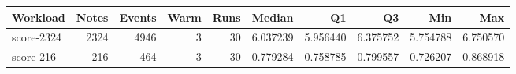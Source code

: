 \begin{tabular}{lrrrrrrrrr}
\hline
Workload & Notes & Events & Warm & Runs & Median & Q1 & Q3 & Min & Max \\
\hline
score-2324 & 2324 & 4946 & 3 & 30 & 6.037239 & 5.956440 & 6.375752 & 5.754788 & 6.750570 \\
score-216 & 216 & 464 & 3 & 30 & 0.779284 & 0.758785 & 0.799557 & 0.726207 & 0.868918 \\
\hline
\end{tabular}

